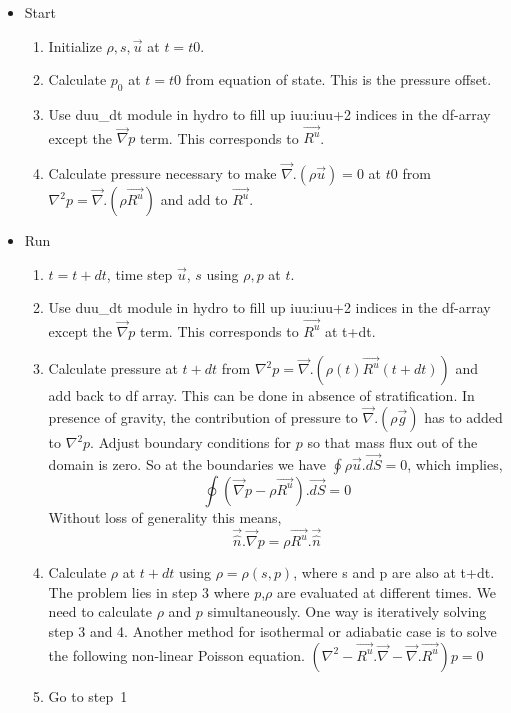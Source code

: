 \documentclass[mathleft]{article}
\begin{document}
\begin{itemize}
\item Start
\begin{enumerate} 
\item Initialize $\rho, s, \vec{u}$ at $t=t0$.
\item Calculate $p_0$ at $t=t0$ from equation of state. This is the pressure offset.
\item Use duu\_dt module in hydro to fill up iuu:iuu+2 indices in the
df-array except the $\vec{\nabla} p$ term. This corresponds to $\vec{R^u}$. 
\item Calculate pressure  necessary to make $\vec{\nabla}.(\rho
\vec{u})=0$ at $t0$ from $\nabla^2p = \vec{\nabla}.(\rho \vec{R^u})$ and add to $\vec{R^u}$.
\end{enumerate}
\item Run

\begin{enumerate} 
\item $t=t+dt$, time step $\vec{u}$, $s$ using $\rho, p$ 
at $t$.
\item Use duu\_dt module in hydro to fill up iuu:iuu+2 indices in the
df-array except the $\vec{\nabla} p$ term. This corresponds to $\vec{R^u}$ at t+dt. 
\item Calculate pressure at $t+dt$ from $\nabla^2p =
\vec{\nabla}.(\rho(t) \vec{R^u}(t+dt))$ and add back to df array. This
can be done in absence of stratification. In presence of gravity, the
contribution of pressure to $\vec{\nabla}.(\rho \vec{g})$ has to added to $\nabla^2p$. Adjust boundary conditions for $p$ so that mass flux out of the domain is zero.
So at the boundaries we have $\oint\rho \vec{u}.\vec{dS}=0$, which implies,
$$\oint (\vec{\nabla} p - \rho \vec{R^u}).\vec{dS}=0$$
Without loss of generality this means,
$$\vec{\hat{n}}.\vec{\nabla} p = \rho \vec{R^u}.\vec{\hat{n}}$$

\item Calculate $\rho$ at $t+dt$ using $\rho = \rho(s, p)$, where s and p are also at t+dt.
The problem lies in step 3 where $p$,$\rho$ are evaluated at different times. We need to calculate $\rho$ and $p$ simultaneously. One way is iteratively solving step 3 and 4. Another method for isothermal or adiabatic case is to solve the following non-linear Poisson equation.
$(\nabla^2 - \vec{R^u}.\vec{\nabla} -\vec{\nabla}.\vec{R^u})p = 0$
\item Go to step~1
\end{enumerate}
\end{itemize}
\end{document}
